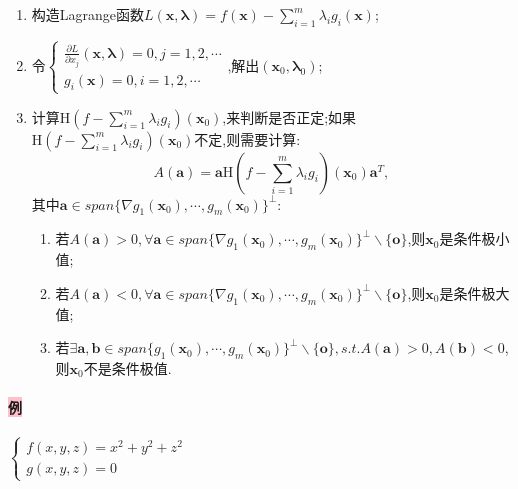 \documentclass[UTF8]{ctexart}
\newcommand{\p}[2]{\frac{\partial #1}{\partial #2}}
\newcommand{\x}{\boldsymbol{x}}
\begin{document}
    \begin{tcolorbox}[colback=red!5!white,arc=1mm,colframe=red!75!black,fonttitle=\bfseries,title=总结:求条件极值的步骤]
        \begin{enumerate}[{Step }1]
            \item 构造Lagrange函数$L(\x,\boldsymbol{\lambda})=f(\x)-\sum_{i=1}^m\lambda_ig_i(\x)$;
            \item 令$\begin{cases}
                \p{L}{x_j}(\x,\boldsymbol{\lambda})=0,j=1,2,\cdots\\
                g_i(\x)=0,i=1,2,\cdots
            \end{cases}$,解出$(\x_0,\boldsymbol{\lambda}_0)$;
            \item 计算$\mathrm{H}(f-\sum_{i=1}^m\lambda_ig_i)(\x_0)$,来判断是否正定;如果$\mathrm{H}(f-\sum_{i=1}^m\lambda_ig_i)(\x_0)$不定,则需要计算:
            $$A(\boldsymbol{a})=\boldsymbol{a}\mathrm{H}(f-\sum_{i=1}^m\lambda_ig_i)(\x_0)\boldsymbol{a}^T,$$
            其中$\boldsymbol{a}\in span\{\nabla g_1(\x_0),\cdots,g_m(\x_0)\}^\perp$:
            \begin{enumerate}[1)]
                \item 若$A(\boldsymbol{a})>0,\forall\boldsymbol{a}\in span\{\nabla g_1(\x_0),\cdots,g_m(\x_0)\}^\perp\backslash\{\boldsymbol{o}\}$,则$\x_0$是条件极小值;
                \item 若$A(\boldsymbol{a})<0,\forall\boldsymbol{a}\in span\{\nabla g_1(\x_0),\cdots,g_m(\x_0)\}^\perp\backslash\{\boldsymbol{o}\}$,则$\x_0$是条件极大值;
                \item 若$\exists\boldsymbol{a},\boldsymbol{b}\in span\{g_1(\x_0),\cdots,g_m(\x_0)\}^\perp\backslash\{\boldsymbol{o}\},s.t.A(\boldsymbol{a})>0,A(\boldsymbol{b})<0$,则$\x_0$不是条件极值.
            \end{enumerate}
        \end{enumerate}
    \end{tcolorbox}
 

    \paragraph{\colorbox{pink}{例}}$\begin{cases}
        f(x,y,z)=x^2+y^2+z^2\\
        g(x,y,z)=0
    \end{cases}$
\end{document}
